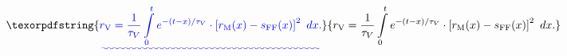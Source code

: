 \documentclass[10pt,a4paper]{article}
\providecommand{\DIFaddtex}[1]{{\protect\color{blue}\uwave{#1}}} %
\providecommand{\DIFaddbegin}{} %
\providecommand{\DIFaddend}{} %
\providecommand{\DIFadd}[1]{\texorpdfstring{\DIFaddtex{#1}}{#1}} %
\newcommand{\DIFaddincludegraphics}[2][]{{\color{blue}\fbox{\DIFOincludegraphics[#1]{#2}}}} %
\DeclareRobustCommand{\DIFaddbegin}{\DIFOaddbegin \let\includegraphics\DIFaddincludegraphics} %
\DeclareRobustCommand{\DIFaddend}{\DIFOaddend \let\includegraphics\DIFOincludegraphics} %
\begin{document}
\DIFaddbegin \begin{align}
\DIFadd{r_\mathrm{V} = \frac{1}{\tau_V} \int\limits_0^t e^{-(t-x)/\tau_V}\cdot \left[r_\mathrm{M}(x) -  s_\mathrm{FF}(x)\right]^2\ dx.
}\end{align}  
\DIFaddend %
\end{document}
